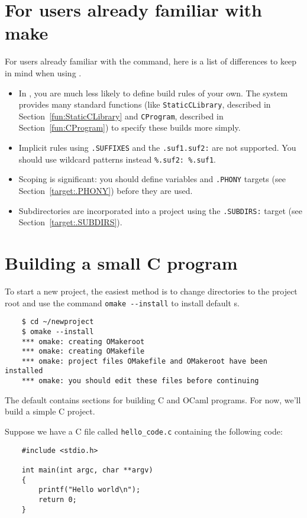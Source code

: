 \section{For users already familiar with make}

For users already familiar with the  command, here is a list of
differences to keep in mind when using .

\begin{itemize}
\item In , you are much less likely to define build rules of your own.
  The system provides many standard functions (like \verb+StaticCLibrary+,
  described in Section~\ref{fun:StaticCLibrary} and \verb+CProgram+,
  described in Section~\ref{fun:CProgram})
  to specify these builds more simply.
\item Implicit rules using \verb+.SUFFIXES+ and the \verb+.suf1.suf2:+ are not supported.
  You should use wildcard patterns instead \verb+%.suf2: %.suf1+.
\item Scoping is significant: you should define variables and \verb+.PHONY+
  targets (see Section~\ref{target:.PHONY}) before they are used.
\item Subdirectories are incorporated into a project using the
  \verb+.SUBDIRS:+ target (see Section~\ref{target:.SUBDIRS}).
\end{itemize}

\section{Building a small C program}

To start a new project, the easiest method is to change directories to the project
root and use the command \verb+omake --install+ to install default s.

\begin{verbatim}
    $ cd ~/newproject
    $ omake --install
    *** omake: creating OMakeroot
    *** omake: creating OMakefile
    *** omake: project files OMakefile and OMakeroot have been installed
    *** omake: you should edit these files before continuing
\end{verbatim}

The default  contains sections for building C and OCaml programs.
For now, we'll build a simple C project.

Suppose we have a C file called \verb+hello_code.c+ containing the following code:

\begin{verbatim}
    #include <stdio.h>

    int main(int argc, char **argv)
    {
        printf("Hello world\n");
        return 0;
    }
\end{verbatim}

